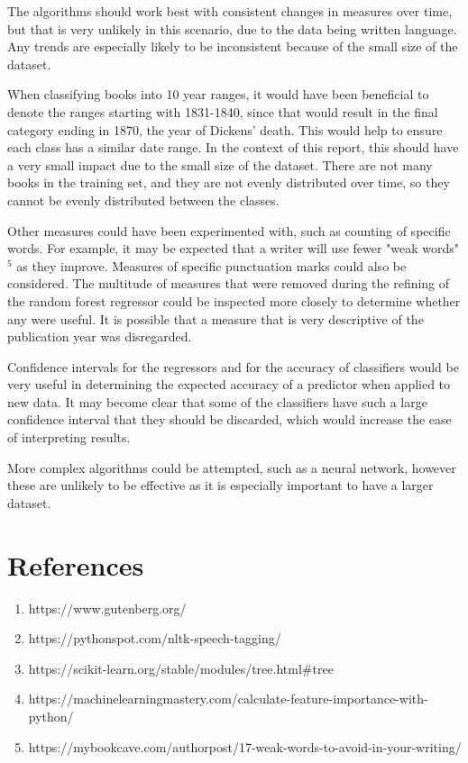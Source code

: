 \documentclass[11pt,a4paper,reqno]{amsart}
\begin{document}
The algorithms should work best with consistent changes in measures over time, but that is very unlikely in this scenario, due to the data being written language. Any trends are especially likely to be inconsistent because of the small size of the dataset. 

When classifying books into 10 year ranges, it would have been beneficial to denote the ranges starting with 1831-1840, since that would result in the final category ending in 1870, the year of Dickens' death. This would help to ensure each class has a similar date range. In the context of this report, this should have a very small impact due to the small size of the dataset. There are not many books in the training set, and they are not evenly distributed over time, so they cannot be evenly distributed between the classes.

Other measures could have been experimented with, such as counting of specific words. For example, it may be expected that a writer will use fewer "weak words"$^5$ as they improve. Measures of specific punctuation marks could also be considered. The multitude of measures that were removed during the refining of the random forest regressor could be inspected more closely to determine whether any were useful. It is possible that a measure that is very descriptive of the publication year was disregarded.

Confidence intervals for the regressors and for the accuracy of classifiers would be very useful in determining the expected accuracy of a predictor when applied to new data. It may become clear that some of the classifiers have such a large confidence interval that they should be discarded, which would increase the ease of interpreting results.

More complex algorithms could be attempted, such as a neural network, however these are unlikely to be effective as it is especially important to have a larger dataset. 

\newpage

\section{References}
\begin{enumerate}
\item https://www.gutenberg.org/
\item https://pythonspot.com/nltk-speech-tagging/
\item https://scikit-learn.org/stable/modules/tree.html{\#}tree
\item https://machinelearningmastery.com/calculate-feature-importance-with-python/
\item https://mybookcave.com/authorpost/17-weak-words-to-avoid-in-your-writing/


\end{enumerate}
















%
\end{document}
